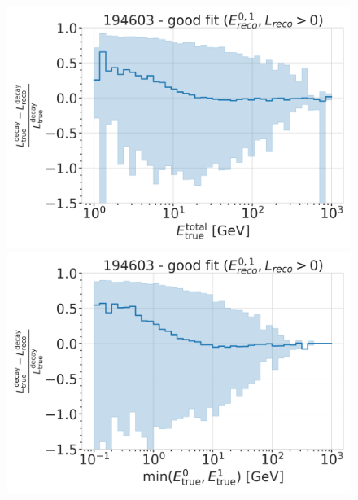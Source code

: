 \begin{figure}[h]
	\centering
    \includegraphics[width=0.49\linewidth]{figures/model_independent_simulation/results/realistic/resolutions/194603_median_decay_length_bias_vs_tot_energy_goodfit_log_unweighted.png}
    \includegraphics[width=0.49\linewidth]{figures/model_independent_simulation/results/realistic/resolutions/194603_median_decay_length_bias_vs_min_energy_goodfit_log_unweighted.png} 
    \caption[]{}
\end{figure}
